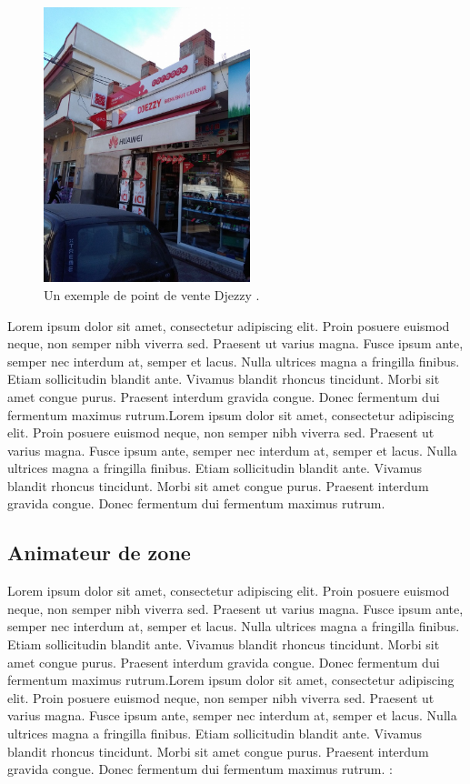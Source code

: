 \medskip


\begin{figure}[hbt!]
  \centering
  \includegraphics[height=8cm]{images_pfe/point-de-vente.jpg}
  \caption{Un exemple de point de vente Djezzy \parencite{web_image_point_de_vente_2019}.}
  \label{fig:point-de-vente}
\end{figure}
\FloatBarrier

Lorem ipsum dolor sit amet, consectetur adipiscing elit. Proin posuere euismod neque, non semper nibh viverra sed. Praesent ut varius magna. Fusce ipsum ante, semper nec interdum at, semper et lacus. Nulla ultrices magna a fringilla finibus. Etiam sollicitudin blandit ante. Vivamus blandit rhoncus tincidunt. Morbi sit amet congue purus. Praesent interdum gravida congue. Donec fermentum dui fermentum maximus rutrum.Lorem ipsum dolor sit amet, consectetur adipiscing elit. Proin posuere euismod neque, non semper nibh viverra sed. Praesent ut varius magna. Fusce ipsum ante, semper nec interdum at, semper et lacus. Nulla ultrices magna a fringilla finibus. Etiam sollicitudin blandit ante. Vivamus blandit rhoncus tincidunt. Morbi sit amet congue purus. Praesent interdum gravida congue. Donec fermentum dui fermentum maximus rutrum.



\subsection{Animateur de zone}

Lorem ipsum dolor sit amet, consectetur adipiscing elit. Proin posuere euismod neque, non semper nibh viverra sed. Praesent ut varius magna. Fusce ipsum ante, semper nec interdum at, semper et lacus. Nulla ultrices magna a fringilla finibus. Etiam sollicitudin blandit ante. Vivamus blandit rhoncus tincidunt. Morbi sit amet congue purus. Praesent interdum gravida congue. Donec fermentum dui fermentum maximus rutrum.Lorem ipsum dolor sit amet, consectetur adipiscing elit. Proin posuere euismod neque, non semper nibh viverra sed. Praesent ut varius magna. Fusce ipsum ante, semper nec interdum at, semper et lacus. Nulla ultrices magna a fringilla finibus. Etiam sollicitudin blandit ante. Vivamus blandit rhoncus tincidunt. Morbi sit amet congue purus. Praesent interdum gravida congue. Donec fermentum dui fermentum maximus rutrum. :

